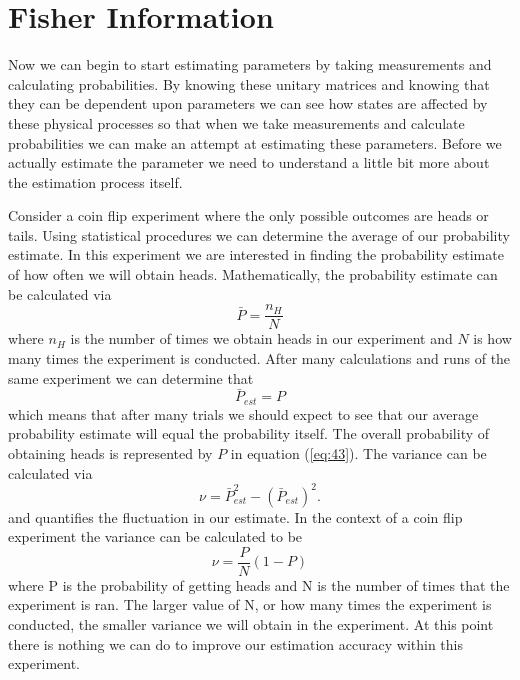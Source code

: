 \documentclass[twocolumn]{article}
\begin{document}
\section*{Fisher Information}
Now we can begin to start estimating parameters by taking measurements and calculating probabilities. By knowing these unitary matrices and knowing that they can be dependent upon parameters we can see how states are affected by these physical processes so that when we take measurements and calculate probabilities we can make an attempt at estimating these parameters. Before we actually estimate the parameter we need to understand a little bit more about the estimation process itself.

Consider a coin flip experiment where the only possible outcomes are heads or tails. Using statistical procedures we can determine the average of our probability estimate. In this experiment we are interested in finding the probability estimate of how often we will obtain heads. Mathematically, the probability estimate can be calculated via
\begin{equation}\label{eq:42}
\bar{P}=\frac{n_H}{N}
\end{equation}
where $n_H$ is the number of times we obtain heads in our experiment and $N$ is how many times the experiment is conducted. After many calculations and runs of the same experiment we can determine that
\begin{equation} \label{eq:43}
\bar{P}_{est}=P
\end{equation}
which means that after many trials we should expect to see that our average probability estimate will equal the probability itself. The overall probability of obtaining heads is represented by $P$ in equation (\ref{eq:43}). The variance can be calculated via
\begin{equation} \label{eq:44}
\nu=\bar{P}^2_{est}-(\bar{P}_{est})^2.
\end{equation}
and quantifies the fluctuation in our estimate. In the context of a coin flip experiment the variance can be calculated to be
\begin{equation} \label{eq:45}
\nu=\frac{P}{N}(1-P)
\end{equation}
where P is the probability of getting heads and N is the number of times that the experiment is ran. The larger value of N, or how many times the experiment is conducted, the smaller variance we will obtain in the experiment. At this point there is nothing we can do to improve our estimation accuracy within this experiment.
\end{document}
